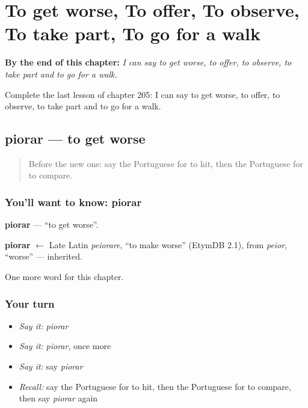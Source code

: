 
\chapter{To get worse, To offer, To observe, To take part, To go for a walk}
\label{ch:pt-to-get-worse-to-offer-to-observe-to-take-part-to-go-for-a-walk}

\begin{chapteropening}
\textbf{By the end of this chapter:} \emph{I can say to get worse, to offer, to observe, to take part and to go for a walk.}

Complete the last lesson of chapter 205: I can say to get worse, to offer, to observe, to take part and to go for a walk.
\end{chapteropening}

\section[piorar]{piorar — to get worse}

\label{lesson:PT-C205-piorar}



\begin{quote}
Before the new one: say the Portuguese for to hit, then the Portuguese for to compare.
\end{quote}

\subsection*{You'll want to know: piorar}
\textbf{piorar} — \textquotedblleft{}to get worse\textquotedblright{}.

\begin{cousinweb}
\textbf{piorar} $\leftarrow$ Late Latin \emph{peiorare}, \textquotedblleft{}to make worse\textquotedblright{} (EtymDB 2.1), from \emph{peior}, \textquotedblleft{}worse\textquotedblright{} — inherited.
\end{cousinweb}

\begin{grammarlens}[title={What you've built}]
One more word for this chapter.
\end{grammarlens}

\subsection*{Your turn}
\begin{itemize}
\raggedright
  \item \emph{Say it:} \emph{piorar}
  \item \emph{Say it:} \emph{piorar}, once more
  \item \emph{Say it:} say \emph{piorar}
  \item \emph{Recall:} say the Portuguese for to hit, then the Portuguese for to compare, then say \emph{piorar} again
\end{itemize}

